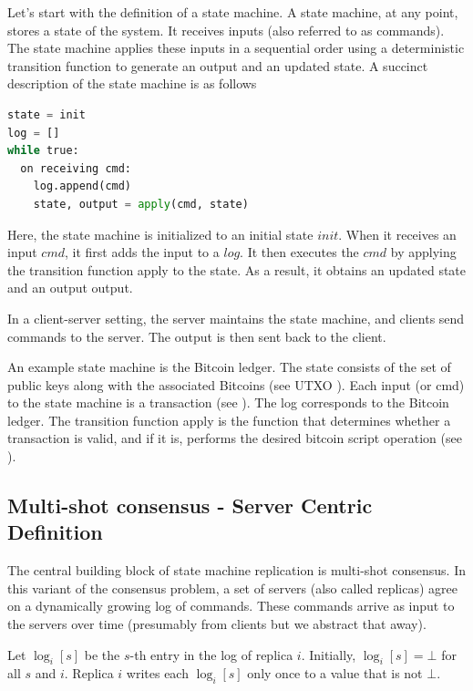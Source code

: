 Let's start with the definition of a state machine.
A state machine, at any point, stores a state of the system.
It receives inputs (also referred to as commands). 
The state machine applies these inputs in a sequential order using a deterministic
transition function to generate an output and an updated state.
A succinct description of the state machine is as follows

\label{smrdef}
  \begin{lstlisting}[language=Python,
    caption={basic SMR}
  ]
state = init
log = []
while true:
  on receiving cmd:
    log.append(cmd)
    state, output = apply(cmd, state)
\end{lstlisting}

Here, the state machine is initialized to an initial state $init$.
When it receives an input $cmd$, it first adds the input to a $log$. 
It then executes the $cmd$ by applying the transition function apply to the state. As a result, it obtains an updated state and an output output.

In a client-server setting, the server maintains the state machine,
 and clients send commands to the server. 
 The output is then sent back to the client.

An example state machine is the Bitcoin ledger. 
The state consists of the set of public keys along with the associated 
Bitcoins (see UTXO ). 
Each input (or cmd) to the state machine is a transaction 
(see ).
The log corresponds to the Bitcoin ledger. 
The transition function apply is the function that determines whether a 
transaction is valid, and if it is, 
performs the desired bitcoin script operation (see ).

\subsection{Multi-shot consensus - Server Centric Definition}
The central building block of state machine replication is multi-shot consensus.
In this variant of the consensus problem, a set of servers (also called replicas)
 agree on a dynamically growing log of commands.
 These commands arrive as input to the servers over time 
 (presumably from clients but we abstract that away).

Let $\log_i[s]$ be the $s$-th entry in the log of replica $i$. 
Initially, $\log_i[s]=\bot$ for all $s$ and $i$. 
Replica $i$ writes each $\log_i[s]$ only once to a value that is not 
$\bot$.

